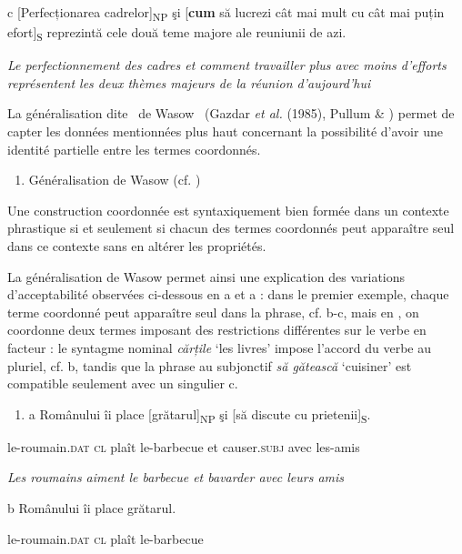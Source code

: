   c  [Perfecționarea cadrelor]\textsubscript{NP} şi [\textbf{cum} să lucrezi cât mai mult cu cât mai puțin efort]\textsubscript{S} reprezintă cele două teme majore ale reuniunii de azi.

{\itshape
Le perfectionnement des cadres et comment travailler plus avec moins d'efforts représentent les deux thèmes majeurs de la réunion d'aujourd'hui}

La généralisation dite {\guillemotleft}~de Wasow~{\guillemotright} (Gazdar \textit{et al.} (1985), Pullum \& \citet{Zwicky1986}) permet de capter les données mentionnées plus haut concernant la possibilité d'avoir une identité partielle entre les termes coordonnés. 


\begin{enumerate}
\item \label{bkm:Ref300654637}Généralisation de Wasow (cf. \citet[26]{Mouret2007})


\end{enumerate}
Une construction coordonnée est syntaxiquement bien formée dans un contexte phrastique si et seulement si chacun des termes coordonnés peut apparaître seul dans ce contexte sans en altérer les propriétés.

La généralisation de Wasow permet ainsi une explication des variations d'acceptabilité observées ci-dessous en a et a : dans le premier exemple, chaque terme coordonné peut apparaître seul dans la phrase, cf. b-c, mais en , on coordonne deux termes imposant des restrictions différentes sur le verbe en facteur : le syntagme nominal \textit{cărțile} `les livres' impose l'accord du verbe au pluriel, cf. b, tandis que la phrase au subjonctif \textit{să gătească} `cuisiner' est compatible seulement avec un singulier c.


\begin{enumerate}
\item \label{bkm:Ref269754757}a  Românului  îi  place  [grătarul]\textsubscript{NP}  şi  [să discute  cu  prietenii]\textsubscript{S}.


\end{enumerate}
    le-roumain\textsc{.dat  cl}  plaît  le-barbecue  et  causer.\textsc{subj}  avec  les-amis

{\itshape
Les roumains aiment le barbecue et bavarder avec leurs amis}

  b  Românului  îi  place  grătarul.

    le-roumain\textsc{.dat  cl}  plaît  le-barbecue


